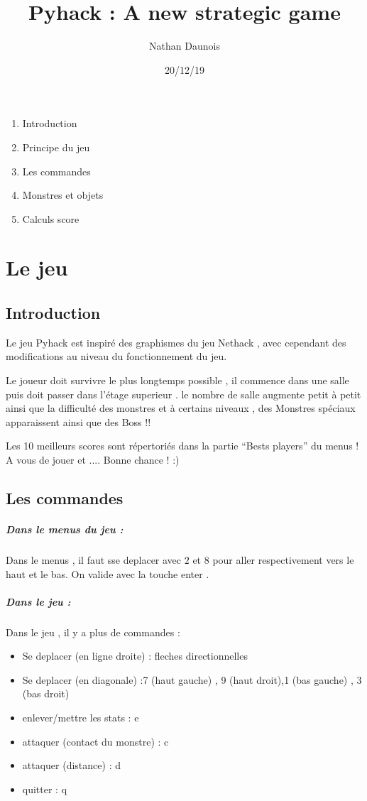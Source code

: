 \documentclass[a4paper,10pt]{article}
\title{Pyhack : A new strategic game }
\author{Nathan Daunois}
\date{20/12/19}
\begin{document}
\maketitle



 
 \begin{enumerate}
\item Introduction  
\item Principe du jeu
\item Les commandes
\item Monstres et objets
\item Calculs score
 \end{enumerate}

\newpage 

\section{Le jeu}
\subsection{Introduction}

Le jeu Pyhack est inspiré des graphismes du jeu Nethack , avec cependant des modifications au niveau du fonctionnement du jeu.

Le joueur doit survivre le plus longtemps possible , il commence dans une salle puis doit passer dans l'étage superieur .
le nombre de salle augmente petit à petit ainsi que la difficulté des monstres et à certains niveaux , des Monstres spéciaux 
apparaissent ainsi que des Boss !! 

Les 10 meilleurs scores sont répertoriés dans la partie ``Bests players'' du menus ! 
A vous de jouer et .... Bonne chance ! :)

\subsection{Les commandes }

\subparagraph{Dans le menus du jeu :}

 Dans le menus , il faut sse deplacer avec $2$ et $8$ pour aller respectivement vers le haut et le bas.
 On valide avec la touche enter .
 
\subparagraph{Dans le jeu :}
Dans le jeu , il y a plus de commandes :
\begin{itemize}
 \item Se deplacer (en ligne droite)  : fleches directionnelles
 \item Se deplacer (en diagonale) :7 (haut gauche) , 9 (haut droit),1 (bas gauche) , 3 (bas droit)
 \item enlever/mettre les stats : e
 \item attaquer (contact du monstre) : c
 \item attaquer (distance) : d
 \item quitter : q
\end{itemize}
\end{document}
